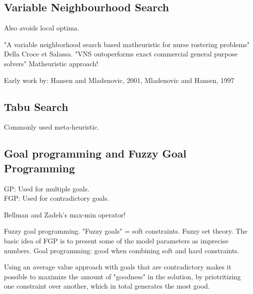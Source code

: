 \subsection{Variable Neighbourhood Search}

Also avoids local optima. 

"A variable neighborhood search based matheuristic for nurse rostering problems" Della Croce et Salassa. "VNS outoperforms exact commercial general purpose solvers"
Matheuristic approach!

Early work by:
Hansen  and  Mladenovic, 2001, Mladenovic and Hansen, 1997

\subsection{Tabu Search}

Commonly used meta-heuristic.

\subsection{Goal programming and Fuzzy Goal Programming}

GP: Used for multiple goals. \\
FGP: Used for contradictory goals.

Bellman and Zadeh's max-min operator!

Fuzzy goal programming.  "Fuzzy goals" = soft constraints. Fuzzy set theory. The basic idea of FGP is to present some of the model parameters as imprecise numbers.
Goal programming: good when combining soft and hard constraints.

Using an average value approach with goals that are contradictory makes it possible to maximize the amount of "goodness" in the solution, by priotritizing one constraint over another, which in total generates the most good.



